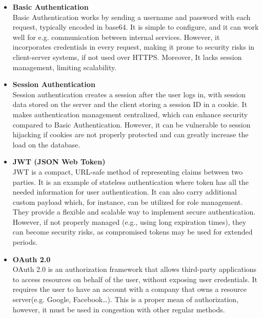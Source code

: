 \begin{itemize}
    \item \textbf{Basic Authentication} \\
    Basic Authentication works by sending a username and password with each request,
    typically encoded in base64.\cite{basic_auth} It is simple to configure, and it can work well for
    e.g. communication between internal services. However, it incorporates credentials in every request,
    making it prone to security risks in client-server systems, if not used over HTTPS.
    Moreover, It lacks session management, limiting scalability.

    \item \textbf{Session Authentication} \\
    Session authentication creates a session after the user logs in, with session
    data stored on the server and the client storing a session ID in a cookie.
    It makes authentication management centralized, which can enhance security compared to Basic Authentication.
    However, it can be vulnerable to session hijacking if cookies are not properly protected
    and can greatly increase the load on the database.\cite{session_auth}

    \item \textbf{JWT (JSON Web Token)} \\
    JWT is a compact, URL-safe method of representing claims between two parties.\cite{jwt}
    It is an example of stateless authentication where token has all the needed information for user authentication.
    It can also carry additional custom payload which, for instance, can be utilized for role management.
    They provide a flexible and scalable way to implement secure authentication.
    However, if not properly managed (e.g., using long expiration times), they can become security risks,
    as compromised tokens may be used for extended periods.

    \item \textbf{OAuth 2.0} \\
    OAuth 2.0 is an authorization framework that allows third-party applications to access resources
    on behalf of the user, without exposing user credentials.\cite{oauth2} It requires the user to have an account
    with a company that owns a resource server(e.g. Google, Facebook\ldots). This is a proper mean of
    authorization, however, it must be used in congestion with other regular methods.
\end{itemize}

